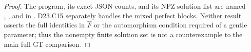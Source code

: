 \begin{proof}
The program, its exact JSON counts, and its NPZ solution list are
named ,
, and
 in
.  D23.C15 separately handles the
mixed perfect blocks.  Neither result asserts the full identities
in $\widehat F$ or the automorphism condition required of a gentle
parameter; thus the nonempty finite solution set is not a
counterexample to the main full-GT comparison.
\end{proof}
